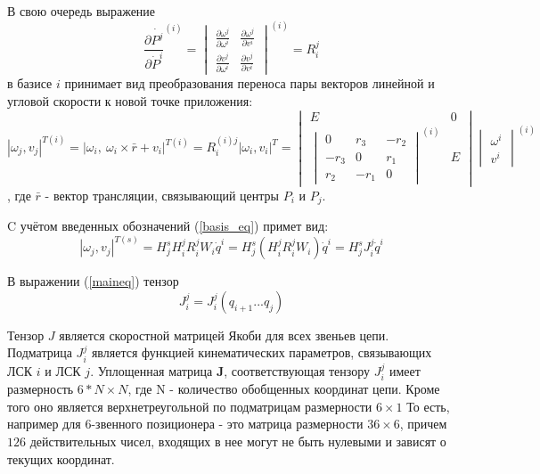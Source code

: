 В свою очередь выражение
\begin{equation}\label{}
\frac{\partial{\dot{P^j}}}{\partial{\dot{P}^i}}^{(i)}
=
\begin{vmatrix}
\frac{\partial{\omega^j}}{\partial{\omega^i}} & \frac{\partial{\omega^j}}{\partial{v^i}} \\
\frac{\partial{v^j}}{\partial{\omega^i}} & \frac{\partial{v^j}}{\partial{v^i}}
\end{vmatrix}^{(i)}=R_i^j
\end{equation}
в базисе $i$ принимает вид преобразования переноса пары векторов линейной и угловой скорости к новой точке приложения:
\begin{equation}\label{}
|\omega_j, v_j|^{T(i)} = |\omega_i,\ \omega_i \times \bar{r} + v_i|^{T(i)} = R^{(i)j}_{i}|\omega_i, v_i|^T=
\begin{vmatrix}
E & 0\\
\begin{vmatrix}
0 & r_3 & -r_2\\
-r_3 & 0 & r_1\\
r_2 & -r_1 & 0
\end{vmatrix}
^{(i)} & E
\end{vmatrix}
\begin{vmatrix}
\omega^i\\
v^i
\end{vmatrix}^{(i)}
\end{equation}, где $\bar{r}$ - вектор трансляции, связывающий центры $P_i$ и $P_j$.

C учётом введенных обозначений (\ref{basis_eq}) примет вид:
\begin{equation}\label{maineq}
|\omega_j, v_j|^{T(s)} = H^s_j H^j_i R^j_i W_i \dot{q}^i = H^s_j (H^j_i R^j_i W_i) \dot{q}^i = H^s_j J^{j}_i \dot{q}^i
\end{equation}

В выражении (\ref{maineq}) тензор 
\begin{equation}\label{}
J_i^j = J_i^j(q_{i+1}...q_j)
\end{equation} 

Тензор $J$ является скоростной матрицей Якоби для всех звеньев цепи. Подматрица $J^j_i$ является функцией кинематических параметров, связывающих ЛСК $i$ и ЛСК $j$. Уплощенная матрица $\textbf{J}$, соответствующая тензору $J^j_i$ имеет размерность $6*N \times N$, где N - количество обобщенных координат цепи. Кроме того оно является верхнетреугольной по подматрицам размерности $6\times1$ То есть, например для 6-звенного позиционера - это матрица размерности $36\times6$, причем $126$ действительных чисел, входящих в нее могут не быть нулевыми и зависят о текущих координат.

